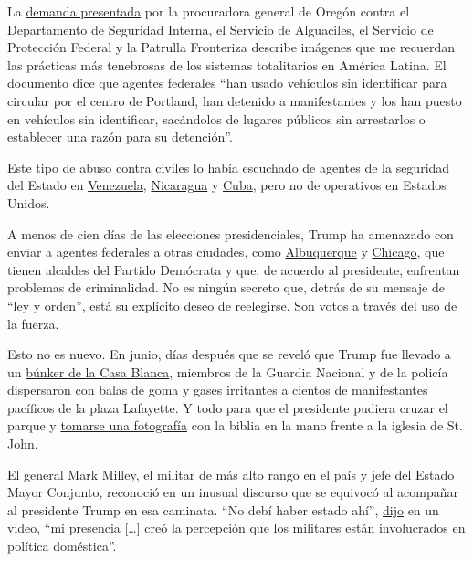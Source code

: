 La
\href{http://opb-imgserve-production.s3-website-us-west-2.amazonaws.com/original/ag_rosenblum_xxxx_updated_complaint_1595086491349.pdf}{demanda
presentada} por la procuradora general de Oregón contra el Departamento
de Seguridad Interna, el Servicio de Alguaciles, el Servicio de
Protección Federal y la Patrulla Fronteriza describe imágenes que me
recuerdan las prácticas más tenebrosas de los sistemas totalitarios en
América Latina. El documento dice que agentes federales ``han usado
vehículos sin identificar para circular por el centro de Portland, han
detenido a manifestantes y los han puesto en vehículos sin identificar,
sacándolos de lugares públicos sin arrestarlos o establecer una razón
para su detención''.

Este tipo de abuso contra civiles lo había escuchado de agentes de la
seguridad del Estado en
\href{https://www.nytimes.com/es/2020/07/26/espanol/opinion/nicmer-evans-venezuela.html}{Venezuela},
\href{https://www.nytimes.com/es/2019/02/18/espanol/opinion/nicaragua-prensa-chamorro.html}{Nicaragua}
y
\href{https://www.nytimes.com/es/2019/05/31/espanol/opinion/cuba-jovenes-revolucion.html}{Cuba},
pero no de operativos en Estados Unidos.

A menos de cien días de las elecciones presidenciales, Trump ha
amenazado con enviar a agentes federales a otras ciudades, como
\href{https://www.santafenewmexican.com/news/local_news/trump-announces-deployment-of-federal-agents-to-albuquerque/article_e80a12d6-cc34-11ea-9ab0-5b1cd8827f75.html}{Albuquerque}
y
\href{https://www.nytimes.com/2020/07/23/us/politics/trump-chicago-federal-agents.html}{Chicago},
que tienen alcaldes del Partido Demócrata y que, de acuerdo al
presidente, enfrentan problemas de criminalidad. No es ningún secreto
que, detrás de su mensaje de ``ley y orden'', está su explícito deseo de
reelegirse. Son votos a través del uso de la fuerza.

Esto no es nuevo. En junio, días después que se reveló que Trump fue
llevado a un
\href{https://www.nytimes.com/2020/05/31/us/politics/trump-protests-george-floyd.html}{búnker
de la Casa Blanca}, miembros de la Guardia Nacional y de la policía
dispersaron con balas de goma y gases irritantes a cientos de
manifestantes pacíficos de la plaza Lafayette. Y todo para que el
presidente pudiera cruzar el parque y
\href{https://www.nytimes.com/es/2020/06/03/espanol/mundo/trump-foto-iglesia-protestas.html}{tomarse
una fotografía} con la biblia en la mano frente a la iglesia de St.
John.

El general Mark Milley, el militar de más alto rango en el país y jefe
del Estado Mayor Conjunto, reconoció en un inusual discurso que se
equivocó al acompañar al presidente Trump en esa caminata. ``No debí
haber estado ahí'',
\href{https://www.nytimes.com/2020/06/11/us/politics/trump-milley-military-protests-lafayette-square.html}{dijo}
en un video, ``mi presencia {[}\ldots{}{]} creó la percepción que los
militares están involucrados en política doméstica''.

